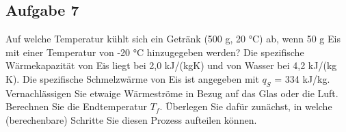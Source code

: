 \documentclass[a4paper,11pt]{article}
\newif\ifshowme
\begin{document}
\ifshowme
\antwort{
\begin{align*}
Q &= m \cdot c \cdot \Delta T \\
Q &= 0,85~\text{kg} \cdot 2 ~\text{kJ/kgK} \cdot 19 ~\text{K} + 0,85~\text{kg} \cdot 334 ~\text{kJ/kg} 
\\&~~~ + 0,85~\text{kg} \cdot 4,62 ~\text{kJ/kgK} \cdot 80 ~\text{K}\\
	&= 630,36 ~\text{kJ}  \\
	&= 630.360,0 ~\text{Ws } && | : 800 ~\text{W} \\
	&= 787.95~\text{s} \\
	&\approx 13~\text{min}~ 8~\text{s}
\end{align*}

}
\else
\pagebreak
\fi






\subsection*{Aufgabe 7}
Auf welche Temperatur kühlt sich ein Getränk (500 g, 20 °C) ab, wenn 50 g Eis mit einer
Temperatur von -20 °C hinzugegeben werden? Die spezifische Wärmekapazität von Eis liegt
bei 2,0 kJ/(kgK) und von Wasser bei 4,2 kJ/(kg K). Die spezifische Schmelzwärme von Eis ist angegeben mit $q_S$ = 334 kJ/kg. Vernachlässigen Sie etwaige Wärmeströme in Bezug auf das
Glas oder die Luft. \pp
Berechnen Sie die Endtemperatur $T_f$. Überlegen Sie dafür zunächst, in welche (berechenbare) Schritte Sie diesen Prozess aufteilen können.
\end{document}
